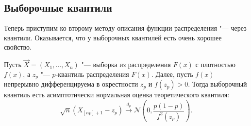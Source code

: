 \subsection{Выборочные квантили}
Теперь приступим ко второму методу описания функции распределения "--- через квантили.
Оказывается, что у выборочных квантилей есть очень хорошее свойство.
\begin{theorem}
	Пусть $\vec{X} = (X_{1}, \ldots, X_{n})$ "--- выборка из распределения $F(x)$ с плотностью $f(x)$, а $z_{p}$ "--- $p$-квантиль распределения $F(x)$.
	Далее, пусть $f(x)$ непрерывно дифференцируема в окрестности $z_{p}$ и $f(z_{p}) > 0$.
	Тогда выборочный квантиль есть асимптотически нормальная оценка теоретического квантиля:
	\[
		\sqrt{n}(X_{[np] + 1} - z_{p}) \xrightarrow{d_{\theta}} \mathcal{N}\left(0, \frac{p(1 - p)}{f^{2}(z_{p})}\right).
	\] 
\end{theorem}
